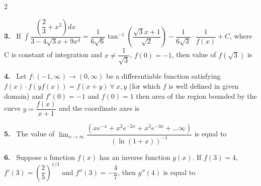 \documentclass[10pt]{extarticle}
\newcommand{\qn}[1]{\par\smallskip\noindent\textbf{#1.}~}
\begin{document}
\begin{multicols}{2}
\qn{3} If $\displaystyle\int\dfrac{\left(\dfrac23+x^2\right)dx}{3-4\sqrt3x+9x^4}=\dfrac1{6\sqrt6}\tan^{-1}\left(\dfrac{\sqrt3x+1}{\sqrt2}\right)-\dfrac1{6\sqrt3}\cdot\dfrac1{f(x)}+C$, where C is constant of integration and $x\neq\dfrac1{\sqrt3}$, $f(0)=-1$, then value of $f\left(\sqrt3\right)$ is
\qn{4} Let $f:(-1,\infty)\to(0,\infty)$ be a differentiable function satisfying $f(x)\cdot f(yf(x))=f(x+y)\ \forall\ x,y$ (for which $f$ is well defined in given domain) and $f'(0)=-1$ and $f(0)=1$ then area of the region bounded by the curve $y=\dfrac{f(x)}{x+1}$ and the coordinate axes is
\qn{5} The value of $\displaystyle\lim_{x\to\infty}\dfrac{\left(xe^{-x}+x^2e^{-2x}+x^3e^{-3x}+\dots\infty\right)}{\left(\ln(1+x)\right)^{-1}}$ is equal to
\qn{6} Suppose a function $f(x)$ has an inverse function $g(x)$. If $f(3)=4$, $f'(3)=\left(\dfrac25\right)^{1/3}$ and $f''(3)=-\dfrac47$, then $g''(4)$ is equal to
\end{multicols}
\end{document}
